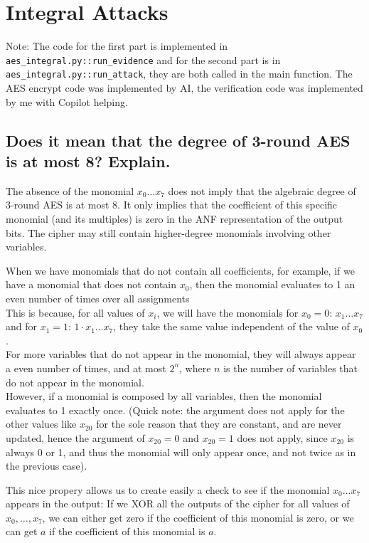 \documentclass{article}
\begin{document}
\section{Integral Attacks}
Note: The code for the first part is implemented in \texttt{aes\_integral.py::run\_evidence} and for the second part is in \texttt{aes\_integral.py::run\_attack}, they are both called in the main function. The AES encrypt code was implemented by AI, the verification code was implemented by me with Copilot helping.

\subsection{Does it mean that the degree of 3-round AES is at most 8? Explain.}
The absence of the monomial $x_0 \dots x_7$ does not imply that the algebraic degree of 3-round AES is at most 8. It only implies that the coefficient of this specific monomial (and its multiples) is zero in the ANF representation of the output bits. The cipher may still contain higher-degree monomials involving other variables.

When we have monomials that do not contain all coefficients, for example, if we have a monomial that does not contain $x_0$, then the monomial evaluates to 1 an even number of times over all assignments\\
This is because, for all values of $x_i$, we will have the monomials for $x_0 = 0$: $x_1 \dots x_7$ and for $x_1 = 1$: $1 \cdot x_1 \dots x_7$, they take the same value independent of the value of $x_0$.\\
For more variables that do not appear in the monomial, they will always appear a even number of times, and at most $2^n$, where $n$ is the number of variables that do not appear in the monomial.\\
However, if a monomial is composed by all variables, then the monomial evaluates to 1 exactly once.
(Quick note: the argument does not apply for the other values like $x_{20}$ for the sole reason that they are constant, and are never updated, hence the argument of $x_{20}=0$ and $x_{20}=1$ does not apply, since $x_{20}$ is always 0 or 1, and thus the monomial will only appear once, and not twice as in the previous case).

This nice propery allows us to create easily a check to see if the monomial $x_0 \dots x_7$ appears in the output: If we XOR all the outputs of the cipher for all values of $x_0,\dots,x_7$, we can either get zero if the coefficient of this monomial is zero, or we can get $a$ if the coefficient of this monomial is $a$.
\end{document}
